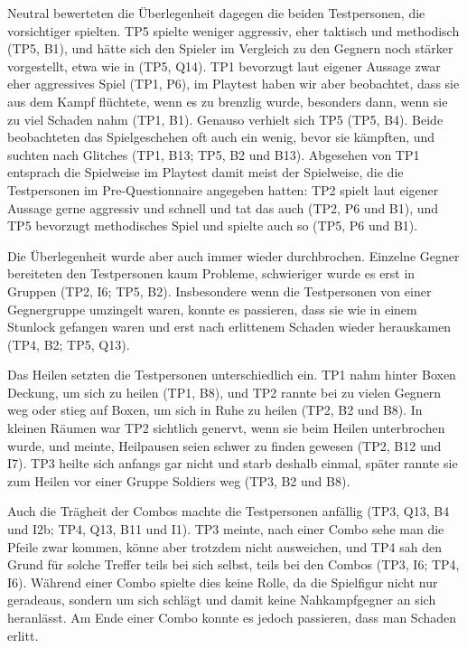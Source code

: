 \documentclass[../Main.tex]{subfiles}
\begin{document}
Neutral bewerteten die Überlegenheit dagegen die beiden Testpersonen, die vorsichtiger spielten. TP5 spielte weniger aggressiv, eher taktisch und methodisch (TP5, B1), und hätte sich den Spieler im Vergleich zu den Gegnern noch stärker vorgestellt, etwa wie in \autocite{omegaforce_hyrulewarriors_2014} (TP5, Q14). TP1 bevorzugt laut eigener Aussage zwar eher aggressives Spiel (TP1, P6), im Playtest haben wir aber beobachtet, dass sie aus dem Kampf flüchtete, wenn es zu brenzlig wurde, besonders dann, wenn sie zu viel Schaden nahm (TP1, B1). Genauso verhielt sich TP5 (TP5, B4). Beide beobachteten das Spielgeschehen oft auch ein wenig, bevor sie kämpften, und suchten nach Glitches (TP1, B13; TP5, B2 und B13). Abgesehen von TP1 entsprach die Spielweise im Playtest damit meist der Spielweise, die die Testpersonen im Pre-Questionnaire angegeben hatten: TP2 spielt laut eigener Aussage gerne aggressiv und schnell und tat das auch (TP2, P6 und B1), und TP5 bevorzugt methodisches Spiel und spielte auch so (TP5, P6 und B1).

Die Überlegenheit wurde aber auch immer wieder durchbrochen. Einzelne Gegner bereiteten den Testpersonen kaum Probleme, schwieriger wurde es erst in Gruppen (TP2, I6; TP5, B2). Insbesondere wenn die Testpersonen von einer Gegnergruppe umzingelt waren, konnte es passieren, dass sie wie in einem Stunlock gefangen waren und erst nach erlittenem Schaden wieder herauskamen (TP4, B2; TP5, Q13).

Das Heilen setzten die Testpersonen unterschiedlich ein. TP1 nahm hinter Boxen Deckung, um sich zu heilen (TP1, B8), und TP2 rannte bei zu vielen Gegnern weg oder stieg auf Boxen, um sich in Ruhe zu heilen (TP2, B2 und B8). In kleinen Räumen war TP2 sichtlich genervt, wenn sie beim Heilen unterbrochen wurde, und meinte, Heilpausen seien schwer zu finden gewesen (TP2, B12 und I7). TP3 heilte sich anfangs gar nicht und starb deshalb einmal, später rannte sie zum Heilen vor einer Gruppe Soldiers weg (TP3, B2 und B8).

Auch die Trägheit der Combos machte die Testpersonen anfällig (TP3, Q13, B4 und I2b; TP4, Q13, B11 und I1). TP3 meinte, nach einer Combo sehe man die Pfeile zwar kommen, könne aber trotzdem nicht ausweichen, und TP4 sah den Grund für solche Treffer teils bei sich selbst, teils bei den Combos (TP3, I6; TP4, I6). Während einer Combo spielte dies keine Rolle, da die Spielfigur nicht nur geradeaus, sondern um sich schlägt und damit keine Nahkampfgegner an sich heranlässt. Am Ende einer Combo konnte es jedoch passieren, dass man Schaden erlitt.
\end{document}
